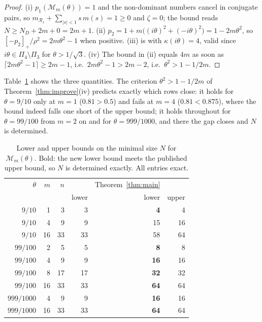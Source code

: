 \documentclass[11pt]{article}
\theoremstyle{plain}
\theoremstyle{remark}
\newcommand{\M}{\mathcal{M}}
\begin{document}
\begin{proof}
(i) $p_1(\M_m(\theta))=1$ and the non-dominant numbers cancel in conjugate pairs, so
$m_{\mathcal R_1}+\sum_{|s|<1}s\,m(s)=1\ge0$ and $\zeta=0$; the bound reads
$N\ge N_D+2m+0=2m+1$. (ii) $p_2=1+m\bigl((i\theta)^{2}+(-i\theta)^{2}\bigr)=1-2m\theta^{2}$,
so $[-p_2]_+/\rho^{2}=2m\theta^{2}-1$ when positive. (iii) is \cite[Thm.~4.4]{Ben20ELA}
with $\kappa(i\theta)=4$, valid since $i\theta\in\Pi_4\setminus\Pi_3$ for
$\theta>1/\sqrt3$. (iv) The bound in (ii) equals $4m$ as soon as
$\lceil2m\theta^{2}-1\rceil\ge2m-1$, i.e.\ $2m\theta^{2}-1>2m-2$, i.e.\
$\theta^{2}>1-1/2m$.
\end{proof}

Table~\ref{tab:improve} shows the three quantities. The criterion $\theta^{2}>1-1/2m$ of
Theorem~\ref{thm:improve}(iv) predicts exactly which rows close: it holds for
$\theta=9/10$ only at $m=1$ ($0.81>0.5$) and fails at $m=4$ ($0.81<0.875$), where the bound
indeed falls one short of the upper bound; it holds throughout for $\theta=99/100$ from
$m=2$ on and for $\theta=999/1000$, and there the gap closes and $N$ is determined.

\begin{table}[ht]
\centering\small
\begin{tabular}{rrrrrr}
\toprule
$\theta$ & $m$ & $n$ & \cite[Thm.~4.7]{Ben20ELA} & Theorem~\ref{thm:main} & \cite[Thm.~4.4]{Ben20ELA}\\
 & & & lower & lower & upper\\
\midrule
$9/10$      &  1 &  3 &  3 &  \textbf{4} &  4\\
$9/10$      &  4 &  9 &  9 & 15 & 16\\
$9/10$      & 16 & 33 & 33 & 58 & 64\\
\midrule
$99/100$    &  2 &  5 &  5 &  \textbf{8} &  8\\
$99/100$    &  4 &  9 &  9 & \textbf{16} & 16\\
$99/100$    &  8 & 17 & 17 & \textbf{32} & 32\\
$99/100$    & 16 & 33 & 33 & \textbf{64} & 64\\
\midrule
$999/1000$  &  4 &  9 &  9 & \textbf{16} & 16\\
$999/1000$  & 16 & 33 & 33 & \textbf{64} & 64\\
\bottomrule
\end{tabular}
\caption{Lower and upper bounds on the minimal size $N$ for $\M_m(\theta)$. Bold: the new
lower bound meets the published upper bound, so $N$ is determined exactly. All entries
exact.}
\label{tab:improve}
\end{table}
\end{document}
